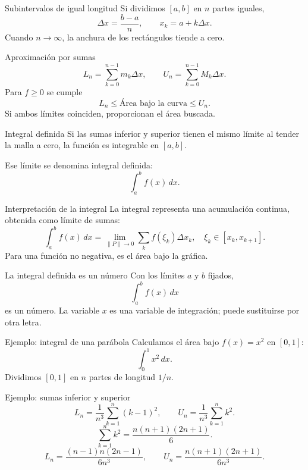 \documentclass[main.tex]{subfiles}
\begin{document}
\begin{frame}{Subintervalos de igual longitud}
Si dividimos $[a,b]$ en $n$ partes iguales,\[\Delta x=\frac{b-a}{n},\qquad x_k=a+k\Delta x.\]Cuando $n\to\infty$, la anchura de los rectángulos tiende a cero.
\end{frame}

\begin{frame}{Aproximación por sumas}
\[L_n=\sum_{k=0}^{n-1}m_k\Delta x,\qquad U_n=\sum_{k=0}^{n-1}M_k\Delta x.\]Para $f\ge0$ se cumple\[L_n\le\text{Área bajo la curva}\le U_n.\]Si ambos límites coinciden, proporcionan el área buscada.
\end{frame}

\begin{frame}{Integral definida}
Si las sumas inferior y superior tienen el mismo límite al tender la malla a cero, la función es integrable en $[a,b]$.\par\medskip Ese límite se denomina \alert{integral definida}:\[\int_a^b f(x)\,dx.\]
\end{frame}

\begin{frame}{Interpretación de la integral}
La integral representa una acumulación continua, obtenida como límite de sumas:\[\int_a^b f(x)\,dx=\lim_{\|P\|\to0}\sum_k f(\xi_k)\Delta x_k,\quad \xi_k\in[x_k,x_{k+1}].\]Para una función no negativa, es el área bajo la gráfica.
\end{frame}

\begin{frame}{La integral definida es un número}
Con los límites $a$ y $b$ fijados,\[\int_a^b f(x)\,dx\]es un número. La variable $x$ es una variable de integración; puede sustituirse por otra letra.
\end{frame}

\begin{frame}{Ejemplo: integral de una parábola}
Calculamos el área bajo $f(x)=x^2$ en $[0,1]$:\[\int_0^1 x^2\,dx.\]Dividimos $[0,1]$ en $n$ partes de longitud $1/n$.
\end{frame}

\begin{frame}{Ejemplo: sumas inferior y superior}
\small\[L_n=\frac{1}{n^3}\sum_{k=1}^n(k-1)^2,\qquad U_n=\frac{1}{n^3}\sum_{k=1}^n k^2.\]\[\sum_{k=1}^n k^2=\frac{n(n+1)(2n+1)}6.\]\[L_n=\frac{(n-1)n(2n-1)}{6n^3},\qquad U_n=\frac{n(n+1)(2n+1)}{6n^3}.\]
\end{frame}
\end{document}
